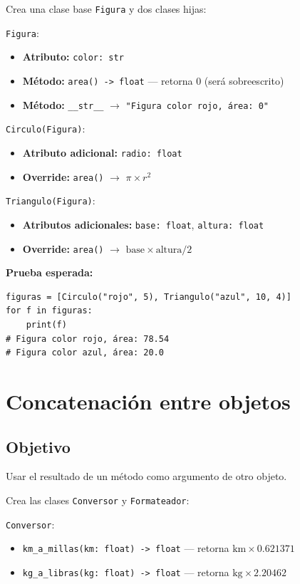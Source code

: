 \documentclass[11pt,letterpaper]{article}
\begin{document}
Crea una clase base \texttt{Figura} y dos clases hijas:

\texttt{Figura}:
\begin{itemize}[nosep]
  \item \textbf{Atributo:} \texttt{color: str}
  \item \textbf{Método:} \texttt{area() -> float} --- retorna 0 (será sobreescrito)
  \item \textbf{Método:} \texttt{\_\_str\_\_} $\to$ \texttt{"Figura color rojo, área: 0"}
\end{itemize}

\texttt{Circulo(Figura)}:
\begin{itemize}[nosep]
  \item \textbf{Atributo adicional:} \texttt{radio: float}
  \item \textbf{Override:} \texttt{area()} $\to$ $\pi \times r^2$
\end{itemize}

\texttt{Triangulo(Figura)}:
\begin{itemize}[nosep]
  \item \textbf{Atributos adicionales:} \texttt{base: float}, \texttt{altura: float}
  \item \textbf{Override:} \texttt{area()} $\to$ $\text{base} \times \text{altura} / 2$
\end{itemize}

\textbf{Prueba esperada:}
\begin{lstlisting}
figuras = [Circulo("rojo", 5), Triangulo("azul", 10, 4)]
for f in figuras:
    print(f)
# Figura color rojo, área: 78.54
# Figura color azul, área: 20.0
\end{lstlisting}

\section{Concatenación entre objetos}
\subsection{Objetivo} Usar el resultado de un método como argumento de otro objeto.

Crea las clases \texttt{Conversor} y \texttt{Formateador}:

\texttt{Conversor}:
\begin{itemize}[nosep]
  \item \texttt{km\_a\_millas(km: float) -> float} --- retorna $\text{km} \times 0.621371$
  \item \texttt{kg\_a\_libras(kg: float) -> float} --- retorna $\text{kg} \times 2.20462$
\end{itemize}
\end{document}
